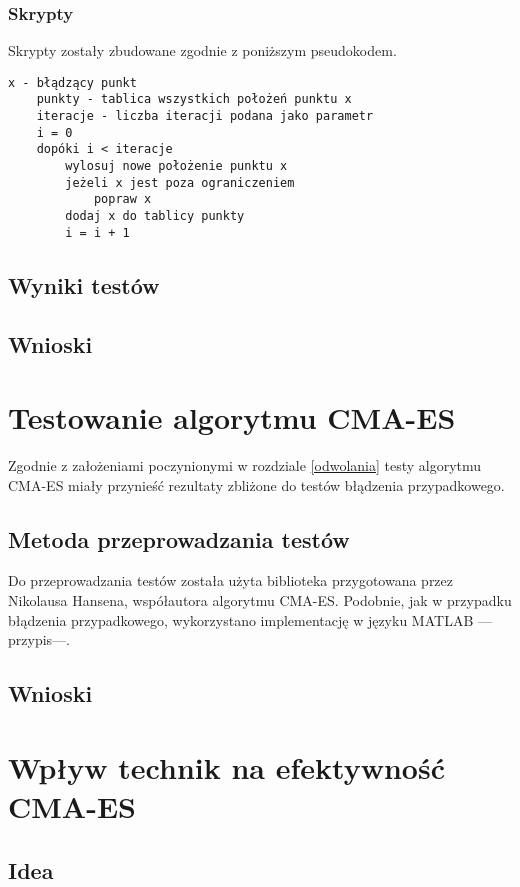\documentclass{mini}
\begin{document}
\subsubsection{Skrypty}
Skrypty zostały zbudowane zgodnie z poniższym pseudokodem.
\begin{Verbatim}[baselinestretch=1.1]
	x - błądzący punkt
	punkty - tablica wszystkich położeń punktu x
	iteracje - liczba iteracji podana jako parametr
	i = 0
	dopóki i < iteracje
		wylosuj nowe położenie punktu x
		jeżeli x jest poza ograniczeniem
			popraw x
		dodaj x do tablicy punkty
		i = i + 1
\end{Verbatim}

\subsection{Wyniki testów}

\subsection{Wnioski}

\pagebreak

\section{Testowanie algorytmu CMA-ES}
Zgodnie z założeniami poczynionymi w rozdziale \ref{odwolania} testy algorytmu CMA-ES miały przynieść rezultaty zbliżone do testów błądzenia przypadkowego.

\subsection{Metoda przeprowadzania testów}
Do przeprowadzania testów została użyta biblioteka przygotowana przez Nikolausa Hansena, współautora algorytmu CMA-ES. Podobnie, jak w przypadku błądzenia przypadkowego, wykorzystano implementację w języku MATLAB ---przypis---.

\subsection{Wnioski}

\pagebreak

\section{Wpływ technik na efektywność CMA-ES}

\subsection{Idea}
\end{document}

